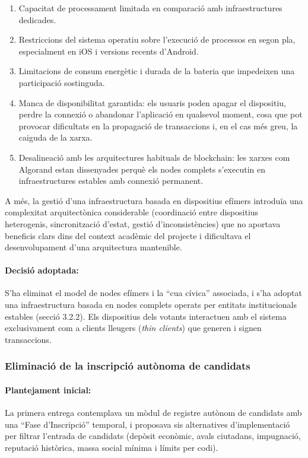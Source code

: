 \begin{enumerate}[label=\roman*.]
    \item Capacitat de processament limitada en comparació amb infraestructures dedicades.
    \item Restriccions del sistema operatiu sobre l'execució de processos en segon pla, especialment en iOS i versions recents d'Android.
    \item Limitacions de consum energètic i durada de la bateria que impedeixen una participació sostinguda.
    \item Manca de disponibilitat garantida: els usuaris poden apagar el dispositiu, perdre la connexió o abandonar l'aplicació en qualsevol moment, cosa que pot provocar dificultats en la propagació de transaccions i, en el cas més greu, la caiguda de la xarxa.
    \item Desalineació amb les arquitectures habituals de blockchain: les xarxes com Algorand estan dissenyades perquè els nodes complets s'executin en infraestructures estables amb connexió permanent.
\end{enumerate}

A més, la gestió d'una infraestructura basada en dispositius efímers introduïa una complexitat arquitectònica considerable (coordinació entre dispositius heterogenis, sincronització d'estat, gestió d'inconsistències) que no aportava beneficis clars dins del context acadèmic del projecte i dificultava el desenvolupament d'una arquitectura mantenible.

\paragraph{Decisió adoptada:}
S'ha eliminat el model de nodes efímers i la ``cua cívica'' associada, i s'ha adoptat una infraestructura basada en nodes complets operats per entitats institucionals estables (secció 3.2.2). Els dispositius dels votants interactuen amb el sistema exclusivament com a clients lleugers (\textit{thin clients}) que generen i signen transaccions.

\subsubsection{Eliminació de la inscripció autònoma de candidats}

\paragraph{Plantejament inicial:}
La primera entrega contemplava un mòdul de registre autònom de candidats amb una ``Fase d'Inscripció'' temporal, i proposava sis alternatives d'implementació per filtrar l'entrada de candidats (depòsit econòmic, avals ciutadans, impugnació, reputació històrica, massa social mínima i límits per codi).

